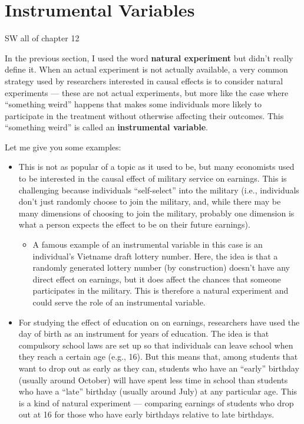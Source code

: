 \documentclass[
  letterpaper,
  DIV=11,
  numbers=noendperiod]{scrreprt}
\providecommand{\tightlist}{%
  \setlength{\itemsep}{0pt}\setlength{\parskip}{0pt}}\usepackage{longtable,booktabs,array}
\begin{document}
\section{Instrumental Variables}\label{instrumental-variables}

SW all of chapter 12

In the previous section, I used the word \textbf{natural experiment} but
didn't really define it. When an actual experiment is not actually
available, a very common strategy used by researchers interested in
causal effects is to consider natural experiments --- these are not
actual experiments, but more like the case where ``something weird''
happens that makes some individuals more likely to participate in the
treatment without otherwise affecting their outcomes. This ``something
weird'' is called an \textbf{instrumental variable}.

Let me give you some examples:

\begin{itemize}
\item
  This is not as popular of a topic as it used to be, but many
  economists used to be interested in the causal effect of military
  service on earnings. This is challenging because individuals
  ``self-select'' into the military (i.e., individuals don't just
  randomly choose to join the military, and, while there may be many
  dimensions of choosing to join the military, probably one dimension is
  what a person expects the effect to be on their future earnings).

  \begin{itemize}
  \tightlist
  \item
    A famous example of an instrumental variable in this case is an
    individual's Vietname draft lottery number. Here, the idea is that a
    randomly generated lottery number (by construction) doesn't have any
    direct effect on earnings, but it does affect the chances that
    someone participates in the military. This is therefore a natural
    experiment and could serve the role of an instrumental variable.
  \end{itemize}
\item
  For studying the effect of education on on earnings, researchers have
  used the day of birth as an instrument for years of education. The
  idea is that compulsory school laws are set up so that individuals can
  leave school when they reach a certain age (e.g., 16). But this means
  that, among students that want to drop out as early as they can,
  students who have an ``early'' birthday (usually around October) will
  have spent less time in school than students who have a ``late''
  birthday (usually around July) at any particular age. This is a kind
  of natural experiment --- comparing earnings of students who drop out
  at 16 for those who have early birthdays relative to late birthdays.
\end{itemize}
\end{document}
